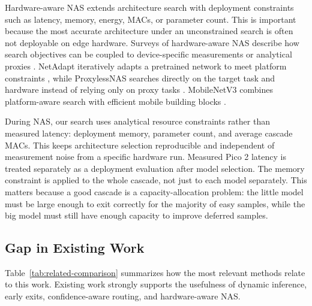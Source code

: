 \documentclass[conference]{IEEEtran}
\begin{document}
Hardware-aware NAS extends architecture search with deployment constraints such
as latency, memory, energy, MACs, or parameter count. This is important because
the most accurate architecture under an unconstrained search is often not
deployable on edge hardware. Surveys of hardware-aware NAS describe how search
objectives can be coupled to device-specific measurements or analytical proxies
\cite{benmeziane2021hwnas}. NetAdapt iteratively adapts a pretrained network to
meet platform constraints \cite{yang2018netadapt}, while ProxylessNAS searches
directly on the target task and hardware instead of relying only on proxy tasks
\cite{cai2019proxylessnas}. MobileNetV3 combines platform-aware search with
efficient mobile building blocks \cite{howard2019mobilenetv3}.

During NAS, our search uses analytical resource constraints rather than measured
latency: deployment memory, parameter count, and average cascade MACs. This
keeps architecture selection reproducible and independent of measurement noise
from a specific hardware run. Measured Pico 2 latency is treated separately as a
deployment evaluation after model selection. The memory constraint is applied to
the whole cascade, not just to each model separately. This matters because a
good cascade is a capacity-allocation problem: the little model must be large
enough to exit correctly for the majority of easy samples, while the big model must still have enough capacity to
improve deferred samples.

\subsection{Gap in Existing Work}
\label{sec:related:gap}

Table~\ref{tab:related-comparison} summarizes how the most relevant methods
relate to this work. Existing work strongly supports the usefulness of dynamic
inference, early exits, confidence-aware routing, and hardware-aware NAS.
\end{document}
